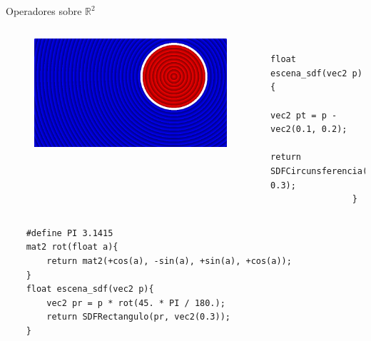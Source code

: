 \begin{frame}[fragile]{Operadores sobre \(\mathbb{R}^2\)}

    \begin{columns}[c, onlytextwidth]
        \column{1.5in}
            \begin{figure}[H]
              \centering
              \includegraphics[width=1.0\textwidth]{imagenes/sdf/2d/sdf_traslacion.png}
            \end{figure}
        
        \column{\dimexpr\paperwidth-10pt}
        
            \begin{lstlisting}
                float escena_sdf(vec2 p){
                    vec2 pt = p - vec2(0.1, 0.2);
                    return SDFCircunsferencia(pt, 0.3);
                }
            \end{lstlisting}
        
    \end{columns}
    
    \begin{columns}[c, onlytextwidth]
        \column{\dimexpr\paperwidth-140pt}
            \begin{lstlisting}
    #define PI 3.1415
    mat2 rot(float a){
        return mat2(+cos(a), -sin(a), +sin(a), +cos(a));
    }
    float escena_sdf(vec2 p){
        vec2 pr = p * rot(45. * PI / 180.);
        return SDFRectangulo(pr, vec2(0.3));
    }
            \end{lstlisting}
    

\end{columns}
\end{frame}
